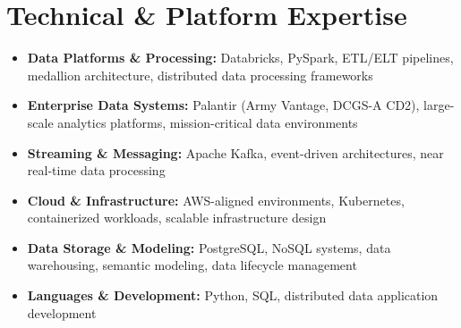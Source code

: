 \section{Technical \& Platform Expertise}

\begin{itemize}
    \item \textbf{Data Platforms \& Processing:} Databricks, PySpark, ETL/ELT pipelines, medallion architecture, distributed data processing frameworks
    \item \textbf{Enterprise Data Systems:} Palantir (Army Vantage, DCGS-A CD2), large-scale analytics platforms, mission-critical data environments
    \item \textbf{Streaming \& Messaging:} Apache Kafka, event-driven architectures, near real-time data processing
    \item \textbf{Cloud \& Infrastructure:} AWS-aligned environments, Kubernetes, containerized workloads, scalable infrastructure design
    \item \textbf{Data Storage \& Modeling:} PostgreSQL, NoSQL systems, data warehousing, semantic modeling, data lifecycle management
    \item \textbf{Languages \& Development:} Python, SQL, distributed data application development
\end{itemize}
